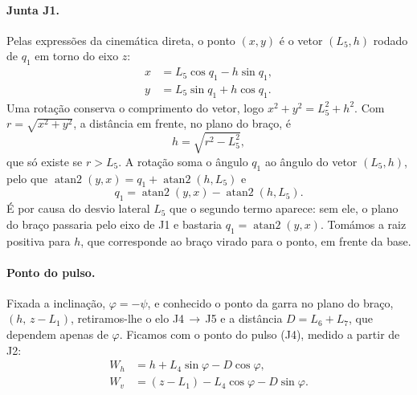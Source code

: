 \paragraph{Junta J1.} Pelas expressões da cinemática direta, o ponto $(x,y)$ é o vetor $(L_5,h)$ rodado de $q_1$ em torno do eixo $z$:
\begin{align*}
x &= L_5\cos q_1 - h\sin q_1,\\
y &= L_5\sin q_1 + h\cos q_1.
\end{align*}
Uma rotação conserva o comprimento do vetor, logo $x^2+y^2=L_5^2+h^2$. Com $r=\sqrt{x^2+y^2}$, a distância em frente, no plano do braço, é
\begin{equation*}
h=\sqrt{r^2-L_5^2},
\end{equation*}
que só existe se $r>L_5$. A rotação soma o ângulo $q_1$ ao ângulo do vetor $(L_5,h)$, pelo que $\operatorname{atan2}(y,x)=q_1+\operatorname{atan2}(h,L_5)$ e
\begin{equation*}
q_1=\operatorname{atan2}(y,x)-\operatorname{atan2}(h,L_5).
\end{equation*}
É por causa do desvio lateral $L_5$ que o segundo termo aparece: sem ele, o plano do braço passaria pelo eixo de J1 e bastaria $q_1=\operatorname{atan2}(y,x)$. Tomámos a raiz positiva para $h$, que corresponde ao braço virado para o ponto, em frente da base.

\paragraph{Ponto do pulso.} Fixada a inclinação, $\varphi=-\psi$, e conhecido o ponto da garra no plano do braço, $(h,\,z-L_1)$, retiramos-lhe o elo J4\,$\to$\,J5 e a distância $D=L_6+L_7$, que dependem apenas de $\varphi$. Ficamos com o ponto do pulso (J4), medido a partir de J2:
\begin{align*}
W_h &= h + L_4\sin\varphi - D\cos\varphi,\\
W_v &= (z-L_1) - L_4\cos\varphi - D\sin\varphi.
\end{align*}

